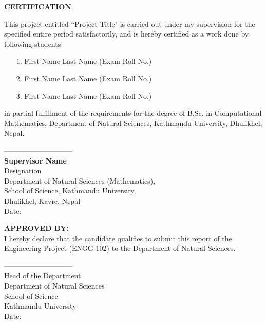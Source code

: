 



\begin{center}
	{\Large{\bf{ CERTIFICATION}}}
\end{center}


\noindent
This project entitled ``Project Title" is carried out  under my supervision for the specified entire period satisfactorily, and is hereby certified as a work done by following students
\begin{itemize}
\item[1.] First Name Last Name (Exam Roll No.)
\item[2.] First Name Last Name (Exam Roll No.)
\item[3.] First Name Last Name (Exam Roll No.)
\end{itemize}
 in partial fulfillment of the requirements for the degree of B.Sc. in Computational Mathematics, Department of Natural Sciences, Kathmandu University, Dhulikhel, Nepal.

\vspace{2.0cm}

\noindent
-----------------------------\\
{\bf Supervisor Name}\\
Designation \\
Department of Natural Sciences (Mathematics),\\
School of Science, Kathmandu University,\\
Dhulikhel, Kavre, Nepal\\
Date:

\vspace{2cm}

\noindent
{\bf APPROVED BY:}\\
I hereby declare that the candidate qualifies to submit this  report of the  Engineering Project (ENGG-102) to the Department of Natural Sciences. 



\vspace{2cm}

\noindent
-----------------------------\\
Head of the Department\\
Department of Natural Sciences\\
School of Science\\
Kathmandu University\\
Date:
  